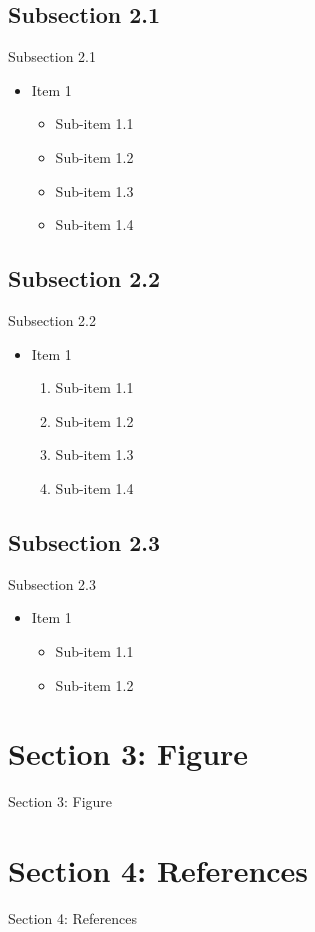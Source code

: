 \documentclass{beamer}
\begin{document}
\subsection{Subsection 2.1}
\begin{frame}{Subsection 2.1}
	\begin{itemize}
	\item Item 1
		\begin{itemize}
		\item Sub-item 1.1
		\item Sub-item 1.2
		\item Sub-item 1.3
		\item Sub-item 1.4
		\end{itemize}
	\end{itemize}
\end{frame}

\subsection{Subsection 2.2}
\begin{frame}{Subsection 2.2}
	\begin{itemize}
	\item Item 1
		\begin{enumerate}
		\item Sub-item 1.1
		\item Sub-item 1.2
		\item Sub-item 1.3
		\item Sub-item 1.4
		\end{enumerate}
	\end{itemize}
\end{frame}

\subsection{Subsection 2.3}
\begin{frame}{Subsection 2.3}
	\begin{itemize}
	\item Item 1
		\begin{itemize}
		\item Sub-item 1.1
		\item Sub-item 1.2
		\end{itemize}
	\end{itemize}
\end{frame}

\section{Section 3: Figure}
\begin{frame}{Section 3: Figure}
\end{frame}

\section{Section 4: References}
\begin{frame}{Section 4: References}
	\nocite{*}
	
\end{frame}
\end{document}
